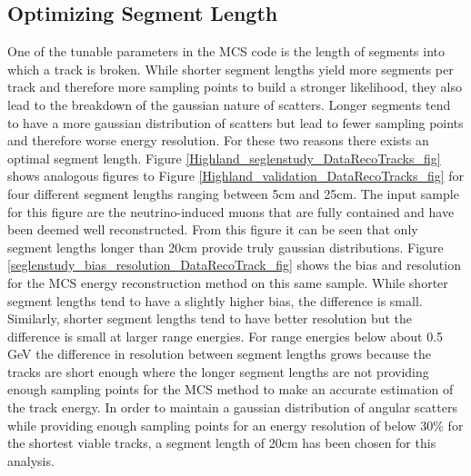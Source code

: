 \subsection{Optimizing Segment Length}\label{SegmentLength_DataRecoTrack_section}
One of the tunable parameters in the MCS code is the length of segments into which a track is broken. While shorter segment lengths yield more segments per track and therefore more sampling points to build a stronger likelihood, they also lead to the breakdown of the gaussian nature of scatters. Longer segments tend to have a more gaussian distribution of scatters but lead to fewer sampling points and therefore worse energy resolution. For these two reasons there exists an optimal segment length. Figure \ref{Highland_seglenstudy_DataRecoTracks_fig} shows analogous figures to Figure \ref{Highland_validation_DataRecoTracks_fig} for four different segment lengths ranging between 5cm and 25cm. The input sample for this figure are the neutrino-induced muons that are fully contained and have been deemed well reconstructed. From this figure it can be seen that only segment lengths longer than 20cm provide truly gaussian distributions. Figure \ref{seglenstudy_bias_resolution_DataRecoTrack_fig} shows the bias and resolution for the MCS energy reconstruction method on this same sample. While shorter segment lengths tend to have a slightly higher bias, the difference is small. Similarly, shorter segment lengths tend to have better resolution but the difference is small at larger range energies. For range energies below about 0.5 GeV the difference in resolution between segment lengths grows because the tracks are short enough where the longer segment lengths are not providing enough sampling points for the MCS method to make an accurate estimation of the track energy. In order to maintain a gaussian distribution of angular scatters while providing enough sampling points for an energy resolution of below 30\% for the shortest viable tracks, a segment length of 20cm has been chosen for this analysis.

